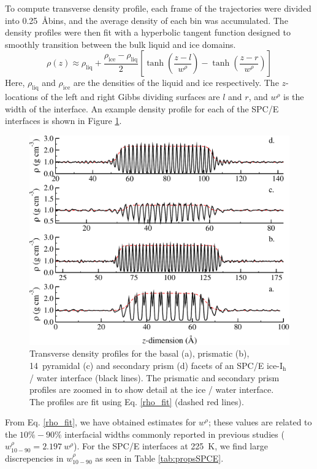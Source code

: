 To compute transverse density profile, each frame of the trajectories
were divided into 0.25~\AA bins, and the average density of each bin
was accumulated. The density profiles were then fit with a hyperbolic
tangent function designed to smoothly transition between the bulk
liquid and ice domains.
\begin{equation}\label{rho_fit}
\rho (z) \approx
\rho_\mathrm{liq}+\frac{\rho_\mathrm{ice}-\rho_\mathrm{liq}}{2}\left[\tanh\left(\frac{z-l}{w^\rho}\right)-\tanh\left(\frac{z-r}{w^\rho}\right)\right]
\end{equation}
Here, $\rho_\mathrm{liq}$ and $\rho_\mathrm{ice}$ are the densities of
the liquid and ice respectively. The $z$-locations of the left and
right Gibbs dividing surfaces are $l$ and $r$, and $w^\rho$ is the
width of the interface. An example density profile for each of the
SPC/E interfaces is shown in Figure \ref{fig:transDensity}.

\begin{figure}[H]
\includegraphics[width=\linewidth]{Figures/transDensity}
\caption{\label{fig:transDensity}Transverse density profiles for the
  basal (a), prismatic (b), 14\degree~pyramidal (c) and secondary prism (d)
  facets of an SPC/E ice-I$_\mathrm{h}$ / water interface (black
  lines). The prismatic and secondary prism profiles are zoomed in to
  show detail at the ice / water interface. The profiles are fit using
  Eq. \eqref{rho_fit} (dashed red lines).}
\end{figure}

From Eq. \eqref{rho_fit}, we have obtained estimates for $w^{\rho}$;
these values are related to the $10\%-90\%$ interfacial widths
commonly reported in previous studies
($w_\mathrm{10-90}^{\rho} = 2.197~w^{\rho}$).\cite{Bryk2002,Bryk2004}
For the SPC/E interfaces at 225~K, we find large discrepencies in
$w_\mathrm{10-90}^{\rho}$ as seen in Table \ref{tab:propsSPCE}.

